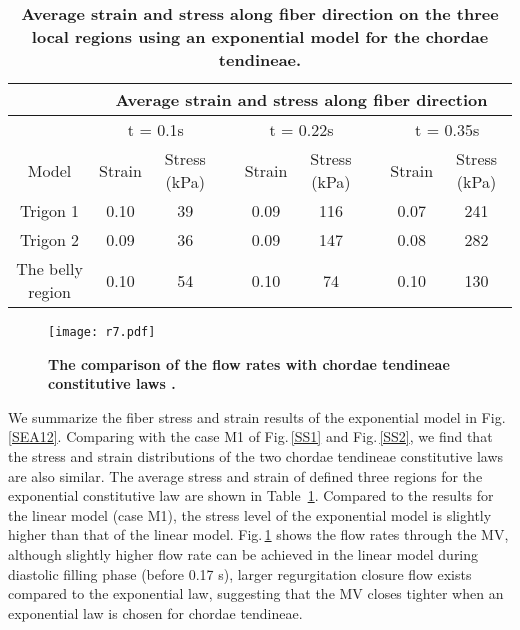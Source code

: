 \documentclass[fleqn,10pt]{wlscirep}
\begin{document}
\begin{table}[!hpbt]
	\caption{\bf  Average strain and stress along fiber direction on the three local regions using an exponential model for the chordae tendineae.}
	\centering
	\begin{tabular}{ccccccccc}
		\hline
		& \multicolumn{8}{c}{Average strain and stress along fiber direction} \\\hline
		& \multicolumn{2}{c}{t = 0.1s} & & \multicolumn{2}{c}{t = 0.22s} & & \multicolumn{2}{c}{t = 0.35s}\\\cline{2-3}\cline{5-6}\cline{8-9}
		Model & Strain & Stress (kPa) & & Strain & Stress (kPa) & & Strain & Stress (kPa) \\\hline
		Trigon 1 & 0.10 & 39 & & 0.09 & 116 & & 0.07 & 241 \\
		Trigon 2 & 0.09 & 36 & & 0.09 & 147 & & 0.08 & 282 \\
		The belly region & 0.10 & 54 & & 0.10 & 74 & & 0.10 & 130 \\
		\hline
	\end{tabular}
	\label{FD3}
\end{table}

\begin{figure}[!hpbt]
	\centering
	\texttt{[image: r7.pdf]}
	\renewcommand{\figurename}{Figure}
	\caption{{\bf The comparison of the flow rates with chordae tendineae constitutive laws .}}
	\label{fig:FL2}
\end{figure}

We summarize the fiber stress and strain results  of the exponential model in Fig.\,\ref{SEA12}. Comparing with the case M1 of Fig.\,\ref{SS1} and Fig.\,\ref{SS2}, we find that the stress and strain distributions of the two chordae tendineae constitutive laws are  also similar. The average stress and strain of defined three regions for the exponential constitutive law are shown in Table~\ref{FD3}. Compared to the results for the linear model (case M1), the stress level of the exponential model is slightly higher than that of the linear model. Fig.\,\ref{fig:FL2} shows the flow rates through the MV, although slightly higher flow rate can be achieved in the linear model during diastolic filling phase (before 0.17 s), larger regurgitation closure flow exists compared to the exponential law,  suggesting that the MV closes  tighter  when an exponential law is chosen for  chordae tendineae. 
\end{document}
